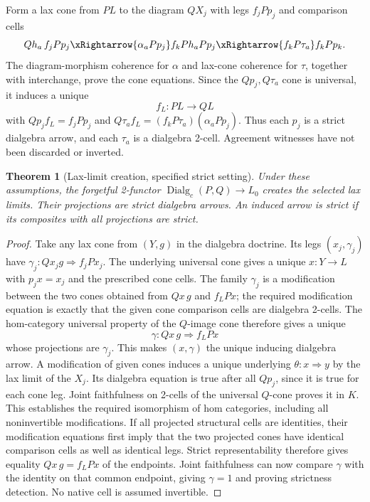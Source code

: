 \documentclass{article}
\newtheorem{theorem}{Theorem}
\begin{document}
Form a lax cone from $PL$ to the diagram $QX_j$ with legs $f_j Pp_j$ and comparison cells
\[
Qh_a\,f_jPp_j
\xRightarrow{\alpha_aPp_j}f_k Ph_a Pp_j
\xRightarrow{f_kP\tau_a}f_k Pp_k.
\]
The diagram-morphism coherence for $\alpha$ and lax-cone coherence for $\tau$, together with interchange, prove the cone equations. Since the $Qp_j,Q\tau_a$ cone is universal, it induces a unique
\[
f_L:PL\longrightarrow QL
\]
with $Qp_j f_L=f_jPp_j$ and $Q\tau_a f_L=(f_kP\tau_a)(\alpha_aPp_j)$. Thus each $p_j$ is a strict dialgebra arrow, and each $\tau_a$ is a dialgebra 2-cell. Agreement witnesses have not been discarded or inverted.

\begin{theorem}[Lax-limit creation, specified strict setting]
Under these assumptions, the forgetful 2-functor $\operatorname{Dialg}_c(P,Q)\to L_0$ creates the selected lax limits. Their projections are strict dialgebra arrows. An induced arrow is strict if its composites with all projections are strict.
\end{theorem}
\begin{proof}
Take any lax cone from $(Y,g)$ in the dialgebra doctrine. Its legs $(x_j,\gamma_j)$ have $\gamma_j:Qx_j g\Rightarrow f_j Px_j$. The underlying universal cone gives a unique $x:Y\to L$ with $p_jx=x_j$ and the prescribed cone cells. The family $\gamma_j$ is a modification between the two cones obtained from $Qx\,g$ and $f_L Px$; the required modification equation is exactly that the given cone comparison cells are dialgebra 2-cells. The hom-category universal property of the $Q$-image cone therefore gives a unique
\[
\gamma:Qx\,g\Rightarrow f_L Px
\]
whose projections are $\gamma_j$. This makes $(x,\gamma)$ the unique inducing dialgebra arrow. A modification of given cones induces a unique underlying $\theta:x\Rightarrow y$ by the lax limit of the $X_j$. Its dialgebra equation is true after all $Qp_j$, since it is true for each cone leg. Joint faithfulness on 2-cells of the universal $Q$-cone proves it in $K$. This establishes the required isomorphism of hom categories, including all noninvertible modifications. If all projected structural cells are identities, their modification equations first imply that the two projected cones have identical comparison cells as well as identical legs. Strict representability therefore gives equality $Qx\,g=f_LPx$ of the endpoints. Joint faithfulness can now compare $\gamma$ with the identity on that common endpoint, giving $\gamma=1$ and proving strictness detection. No native cell is assumed invertible.
\end{proof}
\end{document}
